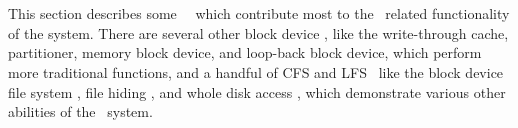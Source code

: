 \section{\Modules}
\label{sec:modules}


This section describes some \Kudos\ \modules\ which contribute most to
the \chdesc\ related functionality of the system. There are several other
block device \modules, like the write-through cache, partitioner, memory
block device, and loop-back block device, which perform more traditional
functions, and a handful of CFS and LFS \modules\ like the block device
file system \module, file hiding \module, and whole disk access \module,
which demonstrate various other abilities of the \module\ system.




